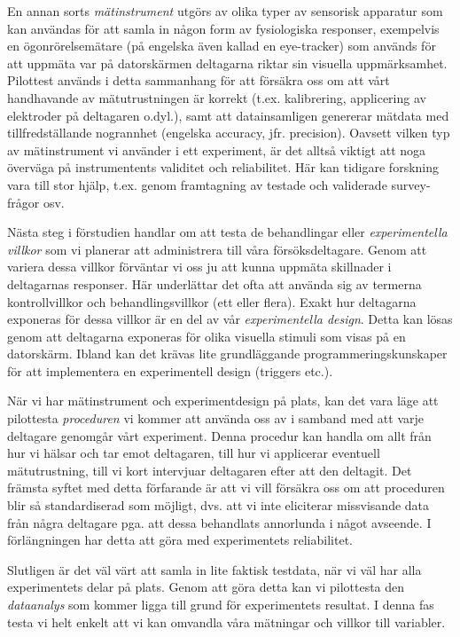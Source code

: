 \documentclass[
]{book}
\begin{document}
En annan sorts \emph{mätinstrument} utgörs av olika typer av sensorisk apparatur som kan användas för att samla in någon form av fysiologiska responser, exempelvis en ögonrörelsemätare (på engelska även kallad en eye-tracker) som används för att uppmäta var på datorskärmen deltagarna riktar sin visuella uppmärksamhet. Pilottest används i detta sammanhang för att försäkra oss om att vårt handhavande av mätutrustningen är korrekt (t.ex. kalibrering, applicering av elektroder på deltagaren o.dyl.), samt att datainsamligen genererar mätdata med tillfredställande nogrannhet (engelska accuracy, jfr. precision). Oavsett vilken typ av mätinstrument vi använder i ett experiment, är det alltså viktigt att noga överväga på instrumentents validitet och reliabilitet. Här kan tidigare forskning vara till stor hjälp, t.ex. genom framtagning av testade och validerade survey-frågor osv.

Nästa steg i förstudien handlar om att testa de behandlingar eller \emph{experimentella villkor} som vi planerar att administrera till våra försöksdeltagare. Genom att variera dessa villkor förväntar vi oss ju att kunna uppmäta skillnader i deltagarnas responser. Här underlättar det ofta att använda sig av termerna kontrollvillkor och behandlingsvillkor (ett eller flera). Exakt hur deltagarna exponeras för dessa villkor är en del av vår \emph{experimentella design}. Detta kan lösas genom att deltagarna exponeras för olika visuella stimuli som visas på en datorskärm. Ibland kan det krävas lite grundläggande programmeringskunskaper för att implementera en experimentell design (triggers etc.).

När vi har mätinstrument och experimentdesign på plats, kan det vara läge att pilottesta \emph{proceduren} vi kommer att använda oss av i samband med att varje deltagare genomgår vårt experiment. Denna procedur kan handla om allt från hur vi hälsar och tar emot deltagaren, till hur vi applicerar eventuell mätutrustning, till vi kort intervjuar deltagaren efter att den deltagit. Det främsta syftet med detta förfarande är att vi vill försäkra oss om att proceduren blir så standardiserad som möjligt, dvs. att vi inte eliciterar missvisande data från några deltagare pga. att dessa behandlats annorlunda i något avseende. I förlängningen har detta att göra med experimentets reliabilitet.

Slutligen är det väl värt att samla in lite faktisk testdata, när vi väl har alla experimentets delar på plats. Genom att göra detta kan vi pilottesta den \emph{dataanalys} som kommer ligga till grund för experimentets resultat. I denna fas testa vi helt enkelt att vi kan omvandla våra mätningar och villkor till variabler.
\end{document}
